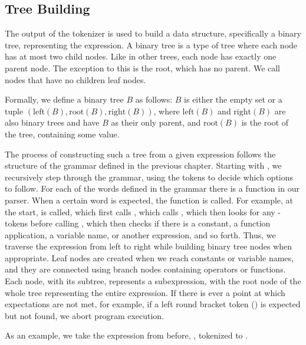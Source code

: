 \documentclass[12pt, a4paper]{report}
\begin{document}
\subsection{Tree Building}
The output of the tokenizer is used to build a data structure, specifically a binary tree, representing the expression.
A binary tree is a type of tree where each node has at most two child nodes.
Like in other trees, each node has exactly one parent node.
The exception to this is the root, which has no parent.
We call nodes that have no children leaf nodes.

Formally, we define a binary tree $B$ as follows:
$B$ is either the empty set or a tuple $(\text{left}(B),\text{root}(B),\text{right}(B))$, where $\text{left}(B)$ and $\text{right}(B)$ are also binary trees and have $B$ as their only parent, and $\text{root}(B)$ is the root of the tree, containing some value.

The process  of constructing such a tree from a given expression follows the structure of the grammar defined in the previous chapter.
Starting with , we recursively step through the grammar, using the tokens to decide which options to follow.
For each of the words defined in the grammar there is a function in our parser.
When a certain word is expected, the function is called.
For example, at the start,  is called, which first calls , which calls , which then looks for any -tokens before calling , which then checks if there is a constant, a function application, a variable name, or another expression, and so forth.
Thus, we traverse the expression from left to right while building binary tree nodes when appropriate.
Leaf nodes are created when we reach constants or variable names, and they are connected using branch nodes containing operators or functions.
Each node, with its subtree, represents a subexpression, with the root node of the whole tree representing the entire expression.
If there is ever a point at which expectations are not met, for example, if a left round bracket token () is expected but not found, we abort program execution.

As an example, we take the expression from before, , tokenized to .
\end{document}
